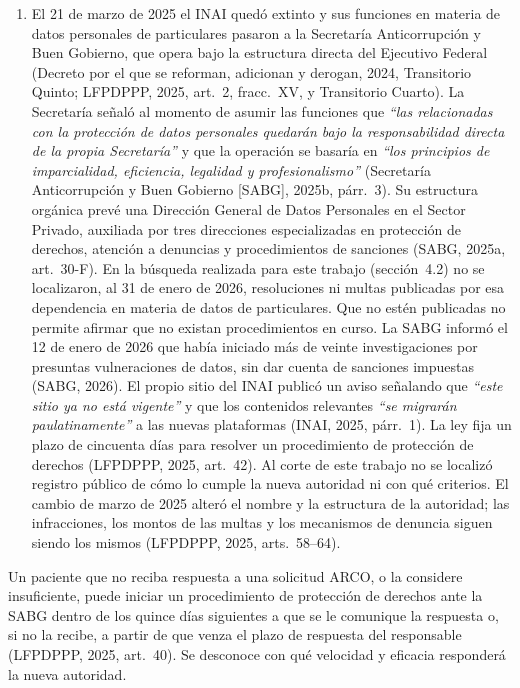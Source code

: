 \documentclass[12pt, a4paper]{article}
\begin{document}
\begin{enumerate}[label=\Roman*.]
  \item El 21 de marzo de 2025 el INAI quedó extinto y sus funciones en
  materia de datos personales de particulares pasaron a la
  Secretaría Anticorrupción y Buen Gobierno, que opera bajo la
  estructura directa del Ejecutivo Federal (Decreto por el que se reforman, adicionan y derogan, 2024, Transitorio Quinto; LFPDPPP, 2025,
  art.~2, fracc.~XV, y Transitorio Cuarto). La Secretaría señaló al momento de asumir
  las funciones que \textit{``las relacionadas con la protección de
  datos personales quedarán bajo la responsabilidad directa de la
  propia Secretaría''} y que la operación se basaría en
  \textit{``los principios de imparcialidad, eficiencia, legalidad
  y profesionalismo''} (Secretaría Anticorrupción y Buen Gobierno
  [SABG], 2025b, párr.~3). Su estructura orgánica prevé una
  Dirección General de Datos Personales en el Sector Privado,
  auxiliada por tres direcciones especializadas en protección de
  derechos, atención a denuncias y procedimientos de sanciones
  (SABG, 2025a, art.~30\mbox{-}F). En la búsqueda realizada para este
  trabajo (sección~4.2) no se localizaron, al 31 de enero de 2026,
  resoluciones ni multas publicadas por esa dependencia en materia de
  datos de particulares. Que no estén publicadas no permite afirmar que no
  existan procedimientos en curso. La SABG
  informó el 12 de enero de 2026 que había iniciado más de veinte
  investigaciones por presuntas vulneraciones de datos, sin dar cuenta
  de sanciones impuestas (SABG, 2026). El propio
  sitio del INAI publicó un aviso señalando que \textit{``este sitio
  ya no está vigente''} y que los contenidos relevantes \textit{``se
  migrarán paulatinamente''} a las nuevas plataformas (INAI, 2025,
  párr.~1). La ley fija un plazo de cincuenta días para resolver un
  procedimiento de protección de derechos (LFPDPPP, 2025, art.~42).
  Al corte de este trabajo no se localizó registro público de cómo
  lo cumple la nueva autoridad ni con qué criterios. El cambio de
  marzo de 2025 alteró el nombre y la estructura de la autoridad;
  las infracciones, los montos de las multas y los mecanismos de
  denuncia siguen siendo los mismos (LFPDPPP, 2025, arts.~58--64).
\end{enumerate}
 
  Un paciente que no reciba respuesta a una solicitud ARCO, o la
  considere insuficiente, puede iniciar un procedimiento de
  protección de derechos ante la SABG dentro de los quince días
  siguientes a que se le comunique la respuesta o, si no la recibe, a partir de que venza el plazo de respuesta del responsable (LFPDPPP, 2025, art.~40). Se desconoce con qué
  velocidad y eficacia responderá la nueva autoridad.
 
\end{document}
